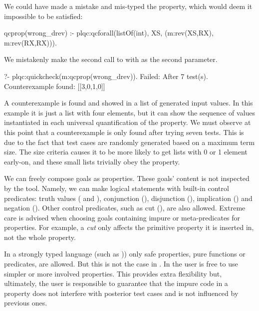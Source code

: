 We could have made a mistake and mis-typed the property, which would deem
it impossible to be satisfied:
%
\begin{yapcode}
 qcprop(wrong_drev) :-
   plqc:qcforall(listOf(int), XS, (m:rev(XS,RX), m:rev(RX,RX))).
\end{yapcode}
%
We mistakenly make the second call to  with  as
the second parameter.
%
\begin{yapcode}
   ?- plqc:quickcheck(m:qcprop(wrong_drev)).
 Failed: After 7 test(s).
 Counterexample found: [[3,0,1,0]]  %
\end{yapcode}
A counterexample is found and showed in a list of generated input
values.
%
In this example it is just a list with four elements, but it can show
the sequence of values instantiated in each universal quantification of
the property.
%
We must observe at this point that a counterexample is only found
after trying seven tests.
%
This is due to the fact that test cases are randomly generated based on
a maximum term size.
%
The size criteria causes it to be more likely to get lists with 0 or 1
element early-on, and these small lists trivially obey the property.


We can freely compose \Prolog{} goals as properties.
%
These goals' content is not inspected by the tool.
%
Namely, we can make logical statements with built-in control predicates:
truth values ( and ), conjunction (), disjunction (), implication () and negation ().
%
%
Other control predicates, such as cut (\yap{!}), are also allowed.%
%
Extreme care is advised when choosing goals containing impure or
meta-predicates for properties.
%
For example, a \emph{cut} only affects the primitive
property it is inserted in, not the whole property.
%


In a strongly typed language (such as \Haskell{}))
only
safe properties, pure functions or predicates, are allowed.
%
But this is not the case in \Prolog{}.
%
%
In \plqc{} the user is
free to use simpler or more involved
properties.
%
This provides extra flexibility but, ultimately, the user
is %
responsible to guarantee that the impure code in a property
does not interfere with posterior test
cases and is not influenced by previous ones.


